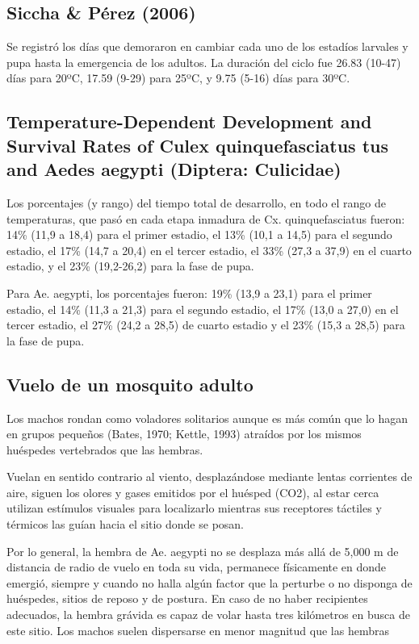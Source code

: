 \subsection{Siccha & Pérez (2006)}
Se registró los días que
demoraron en cambiar cada uno de los estadíos larvales y pupa hasta la
emergencia de los adultos. La duración del ciclo fue 26.83 (10-47) días
para 20ºC, 17.59 (9-29) para 25ºC, y 9.75 (5-16) días para 30ºC.

\subsection{ Temperature-Dependent Development and Survival Rates of
Culex quinquefasciatus tus and Aedes aegypti (Diptera: Culicidae)}

Los porcentajes (y rango) del tiempo total de desarrollo, en todo el rango
de temperaturas, que pasó en cada etapa inmadura de Cx. quinquefasciatus
fueron: 14\% (11,9 a 18,4) para el primer estadio, el 13\% (10,1 a 14,5)
para el segundo estadio, el 17\% (14,7 a 20,4) en el tercer estadio, el
33\% (27,3 a 37,9) en el cuarto estadio, y el 23\% (19,2-26,2) para la
fase de pupa.

Para Ae. aegypti, los porcentajes fueron: 19\% (13,9 a 23,1) para el primer
estadio, el 14\% (11,3 a 21,3) para el segundo estadio, el 17\% (13,0 a 27,0)
en el tercer estadio, el 27\% (24,2 a 28,5) de cuarto estadio y el 23\%
(15,3 a 28,5) para la fase de pupa.


\subsection{Vuelo de un mosquito adulto}
Los machos rondan como voladores solitarios aunque es más común
que lo hagan en grupos pequeños (Bates, 1970; Kettle, 1993) atraídos
por los mismos huéspedes vertebrados que las hembras.

Vuelan en sentido contrario al viento, desplazándose mediante lentas
corrientes de aire, siguen los olores y gases emitidos por el
huésped (CO2), al estar cerca utilizan estímulos visuales para
localizarlo mientras sus receptores táctiles y térmicos las guían
hacia el sitio donde se posan.

Por lo general, la hembra de Ae. aegypti no se desplaza más allá de
5,000 m de distancia de radio de vuelo en toda su vida, permanece
físicamente en donde emergió, siempre y cuando no halla algún factor
que la perturbe o no disponga de huéspedes, sitios de reposo y de
postura. En caso de no haber recipientes adecuados, la hembra grávida
es capaz de volar hasta tres kilómetros en busca de este sitio.
Los machos suelen dispersarse en menor magnitud que las hembras


